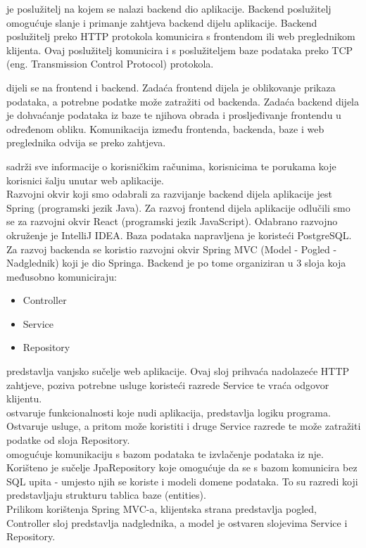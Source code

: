 		  je poslužitelj na kojem se nalazi backend dio aplikacije. Backend poslužitelj omogućuje slanje i primanje zahtjeva backend dijelu aplikacije. Backend poslužitelj preko HTTP protokola komunicira s frontendom ili web preglednikom klijenta. Ovaj poslužitelj komunicira i s poslužiteljem baze podataka preko TCP (eng. Transmission Control Protocol) protokola.
		 
		  dijeli se na frontend i backend. Zadaća frontend dijela je oblikovanje prikaza podataka, a potrebne podatke može zatražiti od backenda. Zadaća backend dijela je dohvaćanje podataka iz baze te njihova obrada i prosljeđivanje frontendu u određenom obliku. Komunikacija između frontenda, backenda, baze i web preglednika odvija se preko zahtjeva.
		 
		  sadrži sve informacije o korisničkim računima, korisnicima te porukama koje korisnici šalju unutar web aplikacije.\\
		 	
		 Razvojni okvir koji smo odabrali za razvijanje backend dijela aplikacije jest Spring (programski jezik Java). Za razvoj frontend dijela aplikacije odlučili smo se za razvojni okvir React (programski jezik JavaScript). Odabrano razvojno okruženje je IntelliJ IDEA. Baza podataka napravljena je koristeći PostgreSQL.\\
		 
		 Za razvoj backenda se koristio razvojni okvir Spring MVC (Model - Pogled - Nadglednik) koji je dio Springa. Backend je po tome organiziran u 3 sloja koja međusobno komuniciraju:
		 \begin{itemize}
		 	\item Controller
		 	\item Service
		 	\item Repository
		 \end{itemize} 
		  predstavlja vanjsko sučelje web aplikacije. Ovaj sloj prihvaća nadolazeće HTTP zahtjeve, poziva potrebne usluge koristeći razrede Service te vraća odgovor klijentu. \\
		  ostvaruje funkcionalnosti koje nudi aplikacija, predstavlja logiku programa. Ostvaruje usluge, a pritom može koristiti i druge Service razrede te može zatražiti podatke od sloja Repository.\\
		  omogućuje komunikaciju s bazom podataka te izvlačenje podataka iz nje. Korišteno je sučelje JpaRepository koje omogućuje da se s bazom komunicira bez SQL upita - umjesto njih se koriste i modeli domene podataka. To su razredi koji predstavljaju strukturu tablica baze (entities).\\
		 Prilikom korištenja Spring MVC-a, klijentska strana predstavlja pogled, Controller sloj predstavlja nadglednika, a model je ostvaren slojevima Service i Repository. \\
		 
